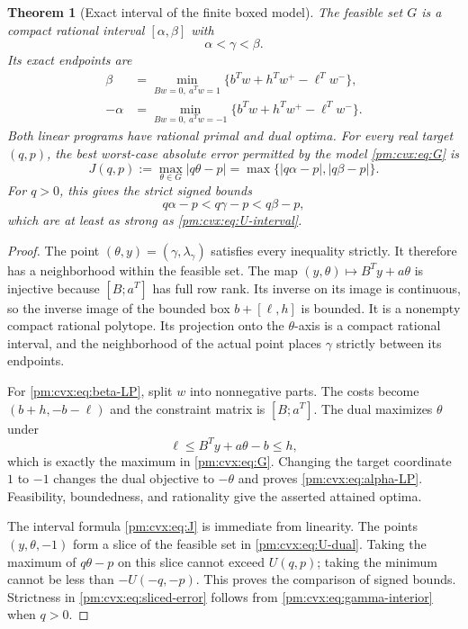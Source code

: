 \documentclass[11pt,a4paper]{article}
\newtheorem{theorem}{Theorem}[section]
\theoremstyle{definition}
\theoremstyle{remark}
\numberwithin{equation}{section}
\begin{document}
\begin{theorem}[Exact interval of the finite boxed model]
\label{pm:cvx:thm:interval}
The feasible set $G$ is a compact rational interval
$[\alpha,\beta]$ with
\begin{equation}\label{pm:cvx:eq:gamma-interior}
 \alpha<\gamma<\beta.
\end{equation}
Its exact endpoints are
\begin{align}
 \beta&=\min_{Bw=0,\ a^Tw=1}
                  \{b^Tw+h^Tw^+-\ell^Tw^-\},
                       \label{pm:cvx:eq:beta-LP}\\
 -\alpha&=\min_{Bw=0,\ a^Tw=-1}
                  \{b^Tw+h^Tw^+-\ell^Tw^-\}.
                       \label{pm:cvx:eq:alpha-LP}
\end{align}
Both linear programs have rational primal and dual optima.  For every
real target $(q,p)$, the best worst-case absolute error permitted by
the model \eqref{pm:cvx:eq:G} is
\begin{equation}\label{pm:cvx:eq:J}
 J(q,p):=\max_{\theta\in G}|q\theta-p|
       =\max\{|q\alpha-p|,|q\beta-p|\}.
\end{equation}
For $q>0$, this gives the strict signed bounds
\begin{equation}\label{pm:cvx:eq:sliced-error}
 q\alpha-p<q\gamma-p<q\beta-p,
\end{equation}
which are at least as strong as \eqref{pm:cvx:eq:U-interval}.
\end{theorem}
\begin{proof}
The point $(\theta,y)=(\gamma,\lambda_\gamma)$ satisfies every
inequality strictly.  It therefore has a neighborhood within the
feasible set.  The map $(y,\theta)\mapsto B^Ty+a\theta$ is
injective because $[B;a^T]$ has full row rank.  Its inverse on its
image is continuous, so the inverse image of the bounded box
$b+[\ell,h]$ is bounded.  It is a nonempty compact rational
polytope.  Its projection onto the $\theta$-axis is a compact
rational interval, and the neighborhood of the actual point places
$\gamma$ strictly between its endpoints.

For \eqref{pm:cvx:eq:beta-LP}, split $w$ into nonnegative parts.  The
costs become $(b+h,-b-\ell)$ and the constraint matrix is
$[B;a^T]$.  The dual maximizes $\theta$ under
\[
 \ell\le B^Ty+a\theta-b\le h,
\]
which is exactly the maximum in \eqref{pm:cvx:eq:G}.  Changing the
target coordinate $1$ to $-1$ changes the dual objective to
$-\theta$ and proves \eqref{pm:cvx:eq:alpha-LP}.  Feasibility,
boundedness, and rationality give the asserted attained optima.

The interval formula \eqref{pm:cvx:eq:J} is immediate from linearity.
The points $(y,\theta,-1)$ form a slice of the feasible set in
\eqref{pm:cvx:eq:U-dual}.  Taking the maximum of $q\theta-p$ on this
slice cannot exceed $U(q,p)$; taking the minimum cannot be less than
$-U(-q,-p)$.  This proves the comparison of signed bounds.  Strictness
in \eqref{pm:cvx:eq:sliced-error} follows from
\eqref{pm:cvx:eq:gamma-interior} when $q>0$.
\end{proof}
\end{document}
